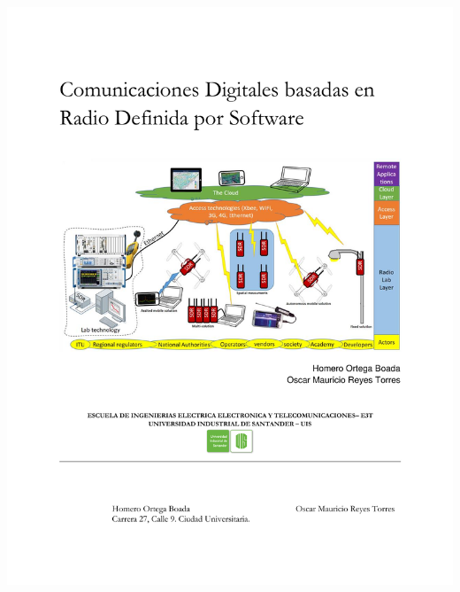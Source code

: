 
\newpage
\begin{center}
\pagestyle{plain}
\includegraphics[trim = 20mm 19mm 19mm 16mm, clip,width=\textwidth]{Imagenes/Portada}%
\par
\end{center}

